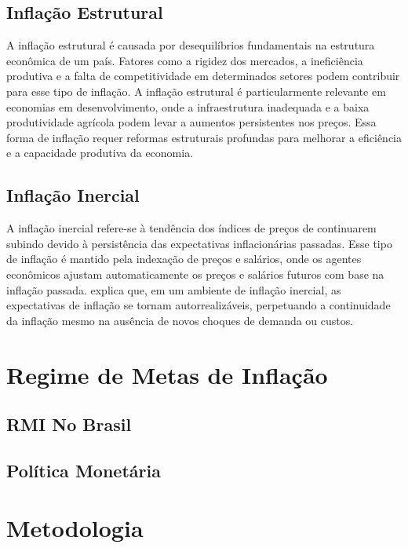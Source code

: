 \documentclass[12pt,oneside,a4paper,chapter=TITLE,english,brazil,sumario=abnt-6027-2012]{abntex2}
\begin{document}
\section{Inflação Estrutural}

A inflação estrutural é causada por desequilíbrios fundamentais na estrutura econômica de um país. Fatores como a rigidez dos mercados, a ineficiência produtiva e a falta de competitividade em determinados setores podem contribuir para esse tipo de inflação. A inflação estrutural é particularmente relevante em economias em desenvolvimento, onde a infraestrutura inadequada e a baixa produtividade agrícola podem levar a aumentos persistentes nos preços. Essa forma de inflação requer reformas estruturais profundas para melhorar a eficiência e a capacidade produtiva da economia.

\section{Inflação Inercial}

A inflação inercial refere-se à tendência dos índices de preços de continuarem subindo devido à persistência das expectativas inflacionárias passadas. Esse tipo de inflação é mantido pela indexação de preços e salários, onde os agentes econômicos ajustam automaticamente os preços e salários futuros com base na inflação passada.  explica que, em um ambiente de inflação inercial, as expectativas de inflação se tornam autorrealizáveis, perpetuando a continuidade da inflação mesmo na ausência de novos choques de demanda ou custos.

\chapter{Regime de Metas de Inflação}

\section{RMI No Brasil}

\section{Política Monetária}

\chapter{Metodologia}
\end{document}
